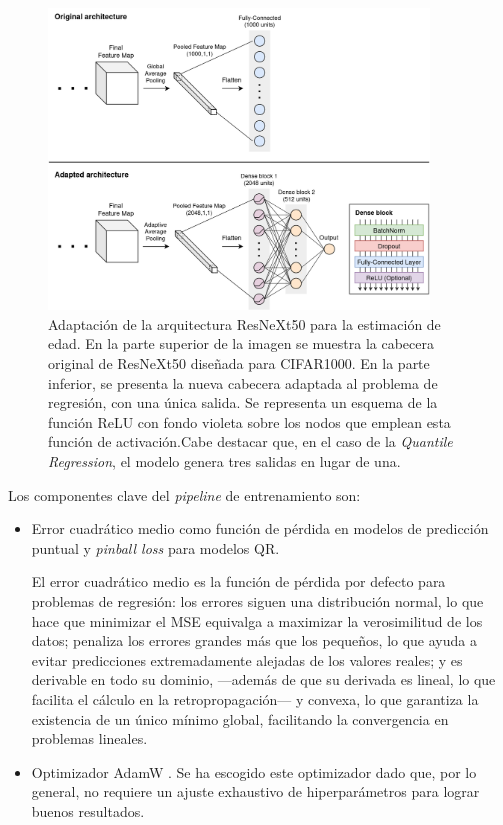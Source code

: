 \begin{figure}[htbp]
    \centering
    \includegraphics[width=0.9\textwidth]{capitulos/cap_05/imagenes/adapted_ResNext50.png}
    \caption[
        Adaptación de la arquitectura ResNeXt50 para la estimación de edad. 
    ]{
        Adaptación de la arquitectura ResNeXt50 para la estimación de edad. En la parte superior de la imagen se muestra la cabecera original de ResNeXt50 diseñada para CIFAR1000. En la parte inferior, se presenta la nueva cabecera adaptada al problema de regresión, con una única salida. Se representa un esquema de la función ReLU con fondo violeta sobre los nodos que emplean esta función de activación.Cabe destacar que, en el caso de la \textit{Quantile Regression}, el modelo genera tres salidas en lugar de una. 
    } 
    \label{fig:adapted_resnext50}
\end{figure}


Los componentes clave del \textit{pipeline} de entrenamiento son:

\begin{itemize}

    \item Error cuadrático medio como función de pérdida en modelos de predicción puntual y \textit{pinball loss} para modelos \acrshort{QR}. 

    El error cuadrático medio es la función de pérdida por defecto para problemas de regresión: los errores siguen una distribución normal, lo que hace que minimizar el MSE equivalga a maximizar la verosimilitud de los datos; penaliza los errores grandes más que los pequeños, lo que ayuda a evitar predicciones extremadamente alejadas de los valores reales; y es derivable en todo su dominio, ---además de que su derivada es lineal, lo que facilita el cálculo en la retropropagación--- y convexa, lo que garantiza la existencia de un único mínimo global, facilitando la convergencia en problemas lineales. 
        
    \item Optimizador AdamW \cite{loshchilov2017}. Se ha escogido este optimizador dado que, por lo general, no requiere un ajuste exhaustivo de hiperparámetros para lograr buenos resultados. 
    
\end{itemize}

